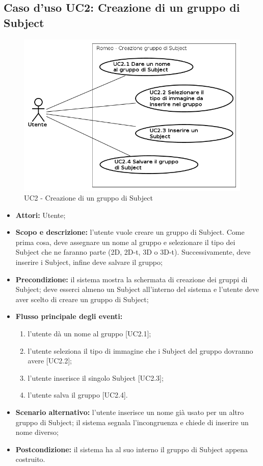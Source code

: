 \subsection{Caso d'uso UC2: Creazione di un gruppo di Subject}
\begin{figure}[!h]
\begin{center}
\includegraphics[scale=0.6]{./img/Use_Case/UC2}
\caption{UC2 - Creazione di un gruppo di Subject}
\end{center}
\end{figure}
\begin{itemize}
\item \textbf{Attori:} Utente;
\item \textbf{Scopo e descrizione:} l'utente vuole creare un gruppo di Subject\glossario{}. Come prima cosa, deve assegnare un nome al gruppo e selezionare il tipo dei Subject\glossario{} che ne faranno parte (2D, 2D-t, 3D o 3D-t). Successivamente, deve inserire i Subject\glossario{}, infine deve salvare il gruppo;
\item \textbf{Precondizione:} il sistema mostra la schermata di creazione dei gruppi di Subject\glossario{}; deve esserci almeno un Subject\glossario{} all'interno del sistema e l'utente deve aver scelto di creare un gruppo di Subject\glossario{};
\item \textbf{Flusso principale degli eventi:}
\begin{enumerate}
\item l'utente dà un nome al gruppo [UC2.1];
\item l'utente seleziona il tipo di immagine che i Subject\glossario{} del gruppo dovranno avere [UC2.2];
\item l'utente inserisce il singolo Subject\glossario{} [UC2.3];
\item l'utente salva il gruppo [UC2.4].
\end{enumerate}
\item \textbf{Scenario alternativo:} l'utente inserisce un nome già usato per un altro gruppo di Subject\glossario{}; il sistema segnala l'incongruenza e chiede di inserire un nome diverso;
\item \textbf{Postcondizione:} il sistema ha al suo interno il gruppo di Subject\glossario{} appena costruito.
\end{itemize}

